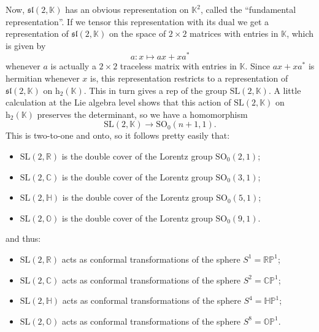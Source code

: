 \documentclass{article}
\def\tightlist{}
\begin{document}
Now, \(\mathfrak{sl}(2,\mathbb{K})\) has an obvious representation on
\(\mathbb{K}^2\), called the ``fundamental representation''. If we
tensor this representation with its dual we get a representation of
\(\mathfrak{sl}(2,\mathbb{K})\) on the space of \(2\times2\) matrices
with entries in \(\mathbb{K}\), which is given by
\[a\colon x \mapsto ax + xa^*\] whenever \(a\) is actually a
\(2\times2\) traceless matrix with entries in \(\mathbb{K}\). Since
\(ax + xa^*\) is hermitian whenever \(x\) is, this representation
restricts to a representation of \(\mathfrak{sl}(2,\mathbb{K})\) on
\(\mathrm{h}_2(\mathbb{K})\). This in turn gives a rep of the group
\(\mathrm{SL}(2,\mathbb{K})\). A little calculation at the Lie algebra
level shows that this action of \(\mathrm{SL}(2,\mathbb{K})\) on
\(\mathrm{h}_2(\mathbb{K})\) preserves the determinant, so we have a
homomorphism \[\mathrm{SL}(2,\mathbb{K}) \to \mathrm{SO}_0(n+1,1).\]
This is two-to-one and onto, so it follows pretty easily that:

\begin{itemize}
\tightlist
\item
  \(\mathrm{SL}(2,\mathbb{R})\) is the double cover of the Lorentz group
  \(\mathrm{SO}_0(2,1)\);
\item
  \(\mathrm{SL}(2,\mathbb{C})\) is the double cover of the Lorentz group
  \(\mathrm{SO}_0(3,1)\);
\item
  \(\mathrm{SL}(2,\mathbb{H})\) is the double cover of the Lorentz group
  \(\mathrm{SO}_0(5,1)\);
\item
  \(\mathrm{SL}(2,\mathbb{O})\) is the double cover of the Lorentz group
  \(\mathrm{SO}_0(9,1)\).
\end{itemize}

and thus:

\begin{itemize}
\tightlist
\item
  \(\mathrm{SL}(2,\mathbb{R})\) acts as conformal transformations of the
  sphere \(S^1 = \mathbb{RP}^1\);
\item
  \(\mathrm{SL}(2,\mathbb{C})\) acts as conformal transformations of the
  sphere \(S^2 = \mathbb{CP}^1\);
\item
  \(\mathrm{SL}(2,\mathbb{H})\) acts as conformal transformations of the
  sphere \(S^4 = \mathbb{HP}^1\);
\item
  \(\mathrm{SL}(2,\mathbb{O})\) acts as conformal transformations of the
  sphere \(S^8 = \mathbb{OP}^1\).
\end{itemize}
\end{document}
